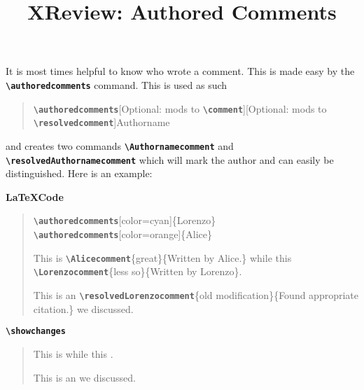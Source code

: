 \documentclass[10pt]{article}
\title{XReview: Authored Comments}
\date{}
\newcommand{\writecommand}[1]{\texttt{\textbf{{\textbackslash#1}}}}
\newcommand{\writearg}[1]{\{#1\}}
\begin{document}
\maketitle

It is most times helpful to know who wrote a comment. This is made easy by the \writecommand{authoredcomments} command. This is used as such 

\begin{quote}
    \writecommand{authoredcomments}[Optional: mods to \writecommand{comment}][Optional: mods to \writecommand{resolvedcomment}]{Authorname}
\end{quote}
\noindent
and creates two commands \writecommand{Authornamecomment} and \writecommand{resolvedAuthornamecomment} which will mark the author and can easily be distinguished.
Here is an example:
~\newline

\textbf{\LaTeX Code}

\begin{quote}
    \writecommand{authoredcomments}[color=cyan]\writearg{Lorenzo}\newline
    \writecommand{authoredcomments}[color=orange]\writearg{Alice}\newline

    This is \writecommand{Alicecomment}\writearg{great}\writearg{Written by Alice.} while this \writecommand{Lorenzocomment}\writearg{less so}\writearg{Written by Lorenzo}.

    This is an \writecommand{resolvedLorenzocomment}\writearg{old modification}\writearg{Found appropriate citation.} we discussed.
\end{quote}

\writecommand{showchanges}
\showchanges

\begin{quote}
This is  while this .

This is an  we discussed.
\end{quote}
\end{document}

